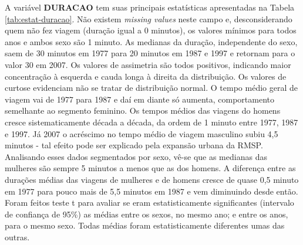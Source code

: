 

A variável \textbf{DURACAO} tem suas principais estatísticas apresentadas na Tabela \ref{tab:estat-duracao}.
Não existem \textit{missing values} neste campo e, desconsiderando quem não fez viagem (duração igual a 0 minutos), os valores mínimos para todos anos e ambos sexo são 1 minuto.
As medianas da duração, independente do sexo, saem de 30 minutos em 1977 para 20 minutos em 1987 e 1997 e retornam para o valor 30 em 2007.
Os valores de assimetria são todos positivos, indicando maior concentração à esquerda e cauda longa à direita da distribuição.
Os valores de curtose evidenciam não se tratar de distribuição normal.
O tempo médio geral de viagem vai de 1977 para 1987 e daí em diante só aumenta, comportamento semelhante ao segmento feminino.
Os tempos médios das viagens do homens cresce sistematicamente década a década, da ordem de 1 minuto entre 1977, 1987 e 1997. Já 2007 o acréscimo no tempo médio de viagem masculino subiu 4,5 minutos - tal efeito pode ser explicado pela expansão urbana da RMSP.
Analisando esses dados segmentados por sexo, vê-se que as medianas das mulheres são sempre 5 minutos a menos que as dos homens. 
A diferença entre as durações médias das viagens de mulheres e de homens cresce de quase 0,5 minuto em 1977 para pouco mais de 5,5 minutos em 1987 e vem diminuindo desde então.
Foram feitos teste t para avaliar se eram estatisticamente significantes (intervalo de confiança de 95\%) as médias entre os sexos, no mesmo ano; e entre os anos, para o mesmo sexo. Todas médias foram estatisticamente diferentes umas das outras.

